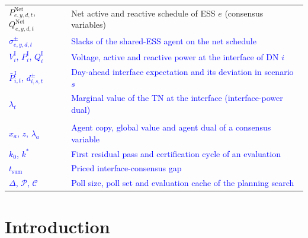 \documentclass[preprint,12pt]{elsarticle}
\begin{document}
\begin{longtable}{@{}>{\raggedright\arraybackslash}p{} >{\raggedright\arraybackslash}p{}@{}}
        $P^{\text{Net}}_{e,y,d,t}$, $Q^{\text{Net}}_{e,y,d,t}$ & Net active and reactive schedule of ESS $e$ (consensus variables) \\
        \textcolor{blue}{$\sigma^{\pm}_{e,y,d,t}$} & \textcolor{blue}{Slacks of the shared-ESS agent on the net schedule} \\
        \textcolor{blue}{$V^{\text{I}}_{i}$, $P^{\text{I}}_{i}$, $Q^{\text{I}}_{i}$} & \textcolor{blue}{Voltage, active and reactive power at the interface of DN $i$} \\
        \textcolor{blue}{$\bar{P}^{\text{I}}_{i,t}$, $d^{\pm}_{i,s,t}$} & \textcolor{blue}{Day-ahead interface expectation and its deviation in scenario $s$} \\
        \textcolor{blue}{$\lambda_t$} & \textcolor{blue}{Marginal value of the TN at the interface (interface-power dual)} \\
        \midrule
        \multicolumn{2}{@{}l}{\textbf{Coordination and certification}}\\*
        \textcolor{blue}{$x_a$, $z$, $\lambda_a$} & \textcolor{blue}{Agent copy, global value and agent dual of a consensus variable} \\
        \textcolor{blue}{$k_0$, $k^{*}$} & \textcolor{blue}{First residual pass and certification cycle of an evaluation} \\
        \textcolor{blue}{$t_{\text{sum}}$} & \textcolor{blue}{Priced interface-consensus gap} \\
        \textcolor{blue}{$\Delta$, $\mathcal{P}$, $\mathcal{C}$} & \textcolor{blue}{Poll size, poll set and evaluation cache of the planning search} \\
    \end{longtable}
    \addtocounter{table}{-1}
\endgroup

\newpage
\section{Introduction}
\end{document}
